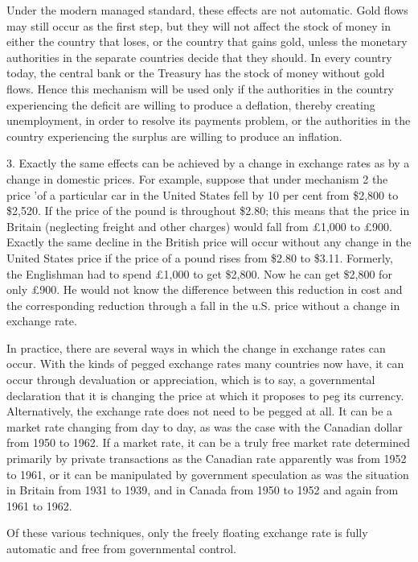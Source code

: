 \documentclass[11pt,openany]{book}
\begin{document}
Under the modern managed standard, these effects are not automatic. Gold flows may still occur as the first step, but they will not affect the stock of money in either the country that loses, or the country that gains gold, unless the monetary authorities in the separate countries decide that they should. In every country today, the central bank or the Treasury has the stock of money without gold flows. Hence this mechanism will be used only if the authorities in the country experiencing the deficit are willing to produce a deflation, thereby creating unemployment, in order to resolve its payments problem, or the authorities in the country experiencing the surplus are willing to produce an inflation.

3. Exactly the same effects can be achieved by a change in exchange rates as by a change in domestic prices. For example, suppose that under mechanism 2 the price 'of a particular car in the United States fell by 10 per cent from \$2,800 to \$2,520. If the price of the pound is throughout \$2.80; this means that the price in Britain (neglecting freight and other charges) would fall from £1,000 to £900. Exactly the same decline in the British price will occur without any change in the United States price if the price of a pound rises from \$2.80 to \$3.11. Formerly, the Englishman had to spend £1,000 to get \$2,800. Now he can get \$2,800 for only £900. He would not know the difference between this reduction in cost and the corresponding reduction through a fall in the u.S. price without a change in exchange rate.

In practice, there are several ways in which the change in exchange rates can occur. With the kinds of pegged exchange rates many countries now have, it can occur through devaluation or appreciation, which is to say, a governmental declaration that it is changing the price at which it proposes to peg its currency. Alternatively, the exchange rate does not need to be pegged at all. It can be a market rate changing from day to day, as was the case with the Canadian dollar from 1950 to 1962. If a market rate, it can be a truly free market rate determined primarily by private transactions as the Canadian rate apparently was from 1952 to 1961, or it can be manipulated by government speculation as was the situation in Britain from 1931 to 1939, and in Canada from 1950 to 1952 and again from 1961 to 1962.

Of these various techniques, only the freely floating exchange rate is fully automatic and free from governmental control.
\end{document}
